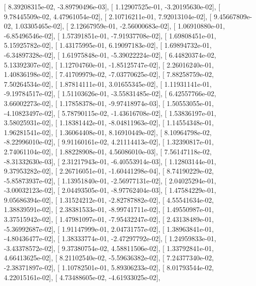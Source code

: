 \documentclass{article}
\begin{document}
       [  8.39208315e-02,  -3.89790496e-03],
       [  1.12907525e-01,  -3.20195630e-02],
       [  9.78445509e-02,   4.47961054e-02],
       [  2.10716211e-01,   7.92013104e-02],
       [  9.45667809e-02,   1.03305465e-02],
       [  2.12667959e-01,  -2.56000683e-02],
       [  1.06910880e-01,  -6.85496546e-02],
       [  1.57391851e-01,  -7.91937708e-02],
       [  1.69808451e-01,   5.15925782e-02],
       [  1.43175995e-01,   6.19097183e-02],
       [  1.69894732e-01,  -6.34897328e-02],
       [  1.61975848e-01,  -5.39022224e-02],
       [  6.44820374e-02,   5.13392307e-02],
       [  1.12704760e-01,  -1.85125747e-02],
       [  2.26016240e-01,   1.40836198e-02],
       [  7.41709979e-02,  -7.03770625e-02],
       [  7.88258759e-02,   7.50264534e-02],
       [  1.87814111e-01,   3.01655345e-02],
       [  1.11931141e-01,  -9.19784517e-02],
       [  1.51103626e-01,  -3.55831485e-02],
       [  6.42557766e-02,   3.66002273e-02],
       [  1.17858378e-01,  -9.97418974e-03],
       [  1.50553055e-01,  -4.10823497e-02],
       [  5.78790115e-02,  -1.43616708e-02],
       [  1.53836197e-01,   3.58025931e-02],
       [  1.18381442e-01,  -8.04811963e-02],
       [  1.14554348e-01,   1.96281541e-02],
       [  1.36064408e-01,   8.16910449e-02],
       [  8.10964798e-02,  -8.22996010e-02],
       [  9.91160161e-02,   4.21114413e-02],
       [  1.32390817e-01,   2.74061104e-02],
       [  1.88228908e-01,   4.56086010e-03],
       [  7.56147118e-02,  -8.31332630e-03],
       [  2.31217943e-01,  -6.40553914e-03],
       [  1.12803144e-01,   9.37953282e-02],
       [  2.26716051e-01,  -1.60441298e-04],
       [  8.74190229e-02,  -5.85873937e-02],
       [  1.13951840e-01,  -2.56977131e-02],
       [  2.04025294e-01,  -3.00032123e-02],
       [  2.04493505e-01,  -8.97762404e-03],
       [  1.47584229e-01,   9.05686394e-02],
       [  1.31524212e-01,  -2.82787882e-02],
       [  4.55541634e-02,   1.38839591e-02],
       [  2.38381533e-01,  -8.99741711e-02],
       [  1.49550987e-01,   3.37515942e-02],
       [  1.47981097e-01,  -7.95432247e-02],
       [  2.43138489e-01,  -5.36992687e-02],
       [  1.91147999e-01,   2.04731757e-02],
       [  1.38963841e-01,  -4.80436477e-02],
       [  1.38333774e-01,  -2.47297792e-02],
       [  1.24959833e-01,  -3.43378572e-02],
       [  9.37380754e-02,   4.58811506e-02],
       [  1.33792841e-01,   4.66413625e-02],
       [  8.21102540e-02,  -5.59636382e-02],
       [  7.24377340e-02,  -2.38371897e-02],
       [  1.10782501e-01,   5.89306233e-02],
       [  8.01793544e-02,   4.22015161e-02],
       [  4.73488605e-02,  -4.61933025e-02],
\end{document}
